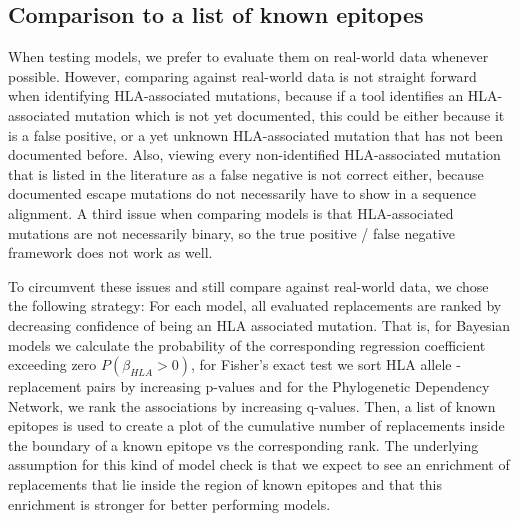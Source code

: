 \documentclass[fleqn,11pt]{SelfArx} %
\begin{document}
\subsection*{Comparison to a list of known epitopes}

When testing models, we prefer to evaluate them on real-world data whenever possible. 
However, comparing against real-world data is not straight forward when identifying HLA-associated mutations, because if a tool identifies an HLA-associated mutation which is not yet documented, this could be either because it is a false positive, or a yet unknown HLA-associated mutation that has not been documented before. 
Also, viewing every non-identified HLA-associated mutation that is listed in the literature as a false negative is not correct either, because documented escape mutations do not necessarily have to show in a sequence alignment.
A third issue when comparing models is that HLA-associated mutations are not necessarily binary, so the true positive / false negative framework does not work as well.

To circumvent these issues and still compare against real-world data, we chose the following strategy:
For each model, all evaluated replacements are ranked by decreasing confidence of being an HLA associated mutation. That is, for Bayesian models we calculate the probability of the corresponding regression coefficient exceeding zero \(P(\beta_{HLA} > 0)\), for Fisher's exact test we sort HLA allele - replacement pairs by increasing p-values and for the Phylogenetic Dependency Network, we rank the associations by increasing q-values.
Then, a list of known epitopes is used to create a plot of the cumulative number of replacements inside the boundary of a known epitope vs the corresponding rank. The underlying assumption for this kind of model check is that we expect to see an enrichment of replacements that lie inside the region of known epitopes and that this enrichment is stronger for better performing models.
\end{document}
